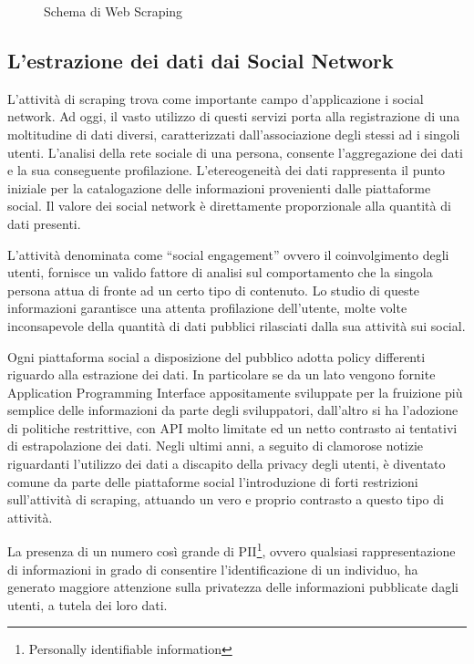 \begin{figure}[!htb]
  \begin{center}
  
  \caption{Schema di Web Scraping}
\end{center}
\end{figure}


\subsection{L'estrazione dei dati dai Social Network} \label{dati_social}
L'attivit\`a di scraping trova come importante campo d'applicazione i social network. Ad oggi, il vasto utilizzo di questi servizi porta alla registrazione di una moltitudine di dati diversi, caratterizzati dall'associazione degli stessi ad i singoli utenti. L'analisi della rete sociale di una persona, consente l'aggregazione dei dati e la sua conseguente profilazione.
L'etereogeneit\`a dei dati rappresenta il punto iniziale per la catalogazione delle informazioni provenienti dalle piattaforme social. Il valore dei social network \`e direttamente proporzionale alla quantit\`a di dati presenti.

L'attivit\`a denominata come ``social engagement'' ovvero il coinvolgimento degli utenti, fornisce un valido fattore di analisi sul comportamento che la singola persona attua di fronte ad un certo tipo di contenuto. Lo studio di queste informazioni garantisce una attenta profilazione dell'utente, molte volte inconsapevole della quantit\`a di dati pubblici rilasciati dalla sua attivit\`a sui social.

Ogni piattaforma social a disposizione del pubblico adotta policy differenti riguardo alla estrazione dei dati. In particolare se da un lato vengono fornite Application Programming Interface appositamente sviluppate per la fruizione pi\`u semplice delle informazioni da parte degli sviluppatori, dall'altro si ha l'adozione di politiche restrittive, con API molto limitate ed un netto contrasto ai tentativi di estrapolazione dei dati. 
Negli ultimi anni, a seguito di clamorose notizie riguardanti l'utilizzo dei dati a discapito della privacy degli utenti, \`e diventato comune da parte delle piattaforme social l'introduzione di forti restrizioni sull'attivit\`a di scraping, attuando un vero e proprio contrasto a questo tipo di attivit\`a.

La presenza di un numero cos\`i grande di PII\footnote{Personally identifiable information}, ovvero qualsiasi rappresentazione di informazioni in grado di consentire l'identificazione di un individuo, ha generato maggiore attenzione sulla privatezza delle informazioni pubblicate dagli utenti, a tutela dei loro dati.\cite{isaak2018user}

